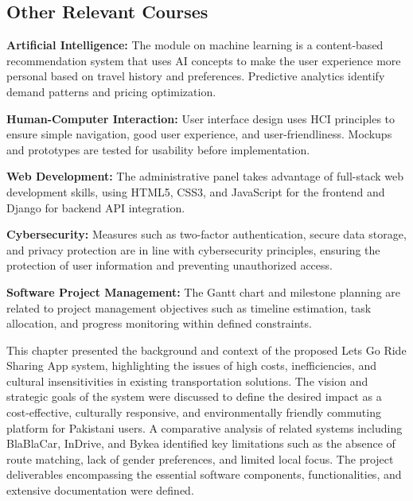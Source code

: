 \subsection{Other Relevant Courses}

\textbf{Artificial Intelligence:} The module on machine learning is a content-based recommendation system that uses AI concepts to make the user experience more personal based on travel history and preferences. Predictive analytics identify demand patterns and pricing optimization.

\textbf{Human-Computer Interaction:} User interface design uses HCI principles to ensure simple navigation, good user experience, and user-friendliness. Mockups and prototypes are tested for usability before implementation.

\textbf{Web Development:} The administrative panel takes advantage of full-stack web development skills, using HTML5, CSS3, and JavaScript for the frontend and Django for backend API integration.

\textbf{Cybersecurity:} Measures such as two-factor authentication, secure data storage, and privacy protection are in line with cybersecurity principles, ensuring the protection of user information and preventing unauthorized access.

\textbf{Software Project Management:} The Gantt chart and milestone planning are related to project management objectives such as timeline estimation, task allocation, and progress monitoring within defined constraints.

This chapter presented the background and context of the proposed Lets Go Ride Sharing App system, highlighting the issues of high costs, inefficiencies, and cultural insensitivities in existing transportation solutions. The vision and strategic goals of the system were discussed to define the desired impact as a cost-effective, culturally responsive, and environmentally friendly commuting platform for Pakistani users. A comparative analysis of related systems including BlaBlaCar, InDrive, and Bykea identified key limitations such as the absence of route matching, lack of gender preferences, and limited local focus. The project deliverables encompassing the essential software components, functionalities, and extensive documentation were defined.
